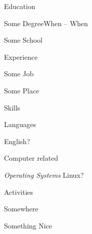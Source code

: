 \documentclass[letterpaper,12pt,oneside]{article}
\begin{document}
\maketitle

\begin{heading}{Education}
\begin{resitem}{Some Degree\hfill When -- When}
\item Some School
\end{resitem}
\end{heading}


\nocite{Some Bib File Entry}


\begin{heading}{Experience}
\begin{resitem}{Some Job}
\item Some Place
\end{resitem}
\end{heading}

\begin{heading}{Skills}
\begin{resitem}{Languages}
\item English?
\end{resitem}
\begin{resitem}{Computer related}
\item \emph{Operating Systems}\hspace*{10pt} Linux?
\end{resitem}
\end{heading}

\begin{heading}{Activities}
\begin{resitem}{Somewhere}
\item Something Nice
\end{resitem}
\end{heading}
\end{document}
